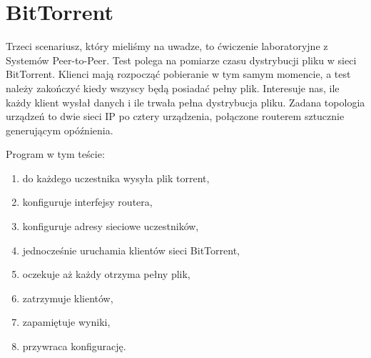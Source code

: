 \documentclass[00-praca-magisterska.tex]{subfiles}
\begin{document}
\section{BitTorrent}


Trzeci scenariusz, który mieliśmy na uwadze, to ćwiczenie laboratoryjne z
Systemów Peer-to-Peer. Test polega na pomiarze czasu dystrybucji pliku w sieci
BitTorrent. Klienci mają rozpocząć pobieranie w tym samym momencie, a test należy
zakończyć kiedy wszyscy będą posiadać pełny plik. Interesuje nas, ile każdy
klient wysłał danych i ile trwała pełna dystrybucja pliku. Zadana topologia
urządzeń to dwie sieci IP po cztery urządzenia, połączone routerem sztucznie
generującym opóźnienia.

Program w tym teście:
\begin{enumerate}
\item do każdego uczestnika wysyła plik torrent,
\item konfiguruje interfejsy routera,
\item konfiguruje adresy sieciowe uczestników,
\item jednocześnie uruchamia klientów sieci BitTorrent,
\item oczekuje aż każdy otrzyma pełny plik,
\item zatrzymuje klientów,
\item zapamiętuje wyniki,
\item przywraca konfigurację.
\end{enumerate}
\end{document}
